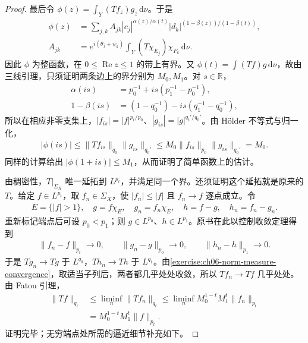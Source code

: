 \documentclass[../../main.tex]{subfiles}
\begin{document}
\begin{proof}
最后令 $\phi(z)=\int_Y(Tf_z)g_z\,\mathrm d\nu$。于是
\begin{align*}
\phi(z)&=\sum_{j,k}A_{jk}|c_j|^{\alpha(z)/\alpha(t)}
|d_k|^{(1-\beta(z))/(1-\beta(t))},\\
A_{jk}&=e^{i(\theta_j+\psi_k)}\int_Y(T\chi_{E_j})\chi_{F_k}\,\mathrm d\nu.
\end{align*}
因此 $\phi$ 为整函数，在 $0\leqslant\operatorname{Re}z\leqslant1$ 的带上有界。又 $\phi(t)=\int(Tf)g\,\mathrm d\nu$，故由三线引理，只须证明两条边上的界分别为 $M_0,M_1$。对 $s\in\mathbb R$，
\begin{align*}
\alpha(is)&=p_0^{-1}+is(p_1^{-1}-p_0^{-1}),\\
1-\beta(is)&=(1-q_0^{-1})-is(q_1^{-1}-q_0^{-1}),
\end{align*}
所以在相应非零支集上，$|f_{is}|=|f|^{p_t/p_0}$、$|g_{is}|=|g|^{q_t'/q_0'}$。由 Hölder 不等式与归一化，
\begin{align*}
|\phi(is)|\leqslant\|Tf_{is}\|_{q_0}\|g_{is}\|_{q_0'}
\leqslant M_0\|f_{is}\|_{p_0}\|g_{is}\|_{q_0'}=M_0.
\end{align*}
同样的计算给出 $|\phi(1+is)|\leqslant M_1$，从而证明了简单函数上的估计。

由稠密性，$T|_{\Sigma_X}$ 唯一延拓到 $L^{p_t}$，并满足同一个界。还须证明这个延拓就是原来的 $T$。给定 $f\in L^{p_t}$，取 $f_n\in\Sigma_X$，使 $|f_n|\leqslant|f|$ 且 $f_n\to f$ 逐点成立。令
\begin{align*}
E=\{|f|>1\},\quad g=f\chi_E,\quad g_n=f_n\chi_E,
\quad h=f-g,\quad h_n=f_n-g_n.
\end{align*}
重新标记端点后可设 $p_0<p_1$；则 $g\in L^{p_0}$、$h\in L^{p_1}$。原书在此以控制收敛定理得到
\begin{align*}
\|f_n-f\|_{p_t}\to0,\qquad
\|g_n-g\|_{p_0}\to0,\qquad
\|h_n-h\|_{p_1}\to0.
\end{align*}
于是 $Tg_n\to Tg$ 于 $L^{q_0}$，$Th_n\to Th$ 于 $L^{q_1}$。由\cref{exercise:ch06-norm-measure-convergence}，取适当子列后，两者都几乎处处收敛，所以 $Tf_n\to Tf$ 几乎处处。由 Fatou 引理，
\begin{align*}
\|Tf\|_{q_t}&\leqslant\liminf_n\|Tf_n\|_{q_t}
\leqslant\liminf_nM_0^{1-t}M_1^t\|f_n\|_{p_t}\\
&=M_0^{1-t}M_1^t\|f\|_{p_t}.
\end{align*}
证明完毕；无穷端点处所需的逼近细节补充如下。
\end{proof}
\end{document}
